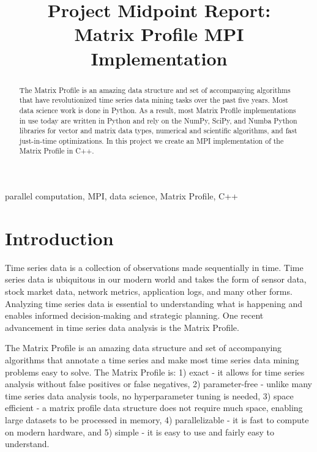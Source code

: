 \documentclass[conference]{IEEEtran}
\begin{document}
\title{Project Midpoint Report:\\Matrix Profile MPI Implementation}

\author{
}


\maketitle
\begin{abstract}
The Matrix Profile is an amazing data structure and set of accompanying algorithms that have revolutionized time series data mining tasks over the past five years.  Most data science work is done in Python.  As a result, most Matrix Profile implementations in use today are written in Python and rely on the NumPy, SciPy, and Numba Python libraries for vector and matrix data types, numerical and scientific algorithms, and fast just-in-time optimizations.  In this project we create an MPI implementation of the Matrix Profile in C++.
\end{abstract}

\begin{IEEEkeywords}
parallel computation, MPI, data science, Matrix Profile, C++
\end{IEEEkeywords}


\section{Introduction}
Time series data is a collection of observations made sequentially in time.  Time series data is ubiquitous in our modern world and takes the form of sensor data, stock market data, network metrics, application logs, and many other forms.  Analyzing time series data is essential to understanding what is happening and enables informed decision-making and strategic planning.  One recent advancement in time series data analysis is the Matrix Profile\cite{MatrixProfile1}. 

The Matrix Profile is an amazing data structure and set of accompanying algorithms that annotate a time series and make most time series data mining problems easy to solve\cite{MatrixProfile2}. The Matrix Profile is:  1) exact - it allows for time series analysis without false positives or false negatives, 2) parameter-free - unlike many time series data analysis tools, no hyperparameter tuning is needed, 3) space efficient - a matrix profile data structure does not require much space, enabling large datasets to be processed in memory, 4) parallelizable - it is fast to compute on modern hardware, and 5) simple - it is easy to use and fairly easy to understand\cite{Keogh}.   
\end{document}
